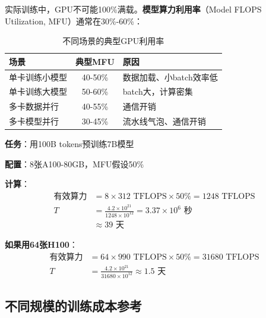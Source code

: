 实际训练中，GPU不可能100\%满载。\textbf{模型算力利用率}（Model FLOPS Utilization, MFU）通常在30\%-60\%：

\begin{table}[htbp]
\centering
\renewcommand{\arraystretch}{1.3}
\begin{tabular}{l|c|l}
\toprule
\textbf{场景} & \textbf{典型MFU} & \textbf{原因} \\
\midrule
单卡训练小模型 & 40-50\% & 数据加载、小batch效率低 \\
单卡训练大模型 & 50-60\% & batch大，计算密集 \\
多卡数据并行 & 40-55\% & 通信开销 \\
多卡模型并行 & 30-45\% & 流水线气泡、通信开销 \\
\bottomrule
\end{tabular}
\caption{不同场景的典型GPU利用率}
\end{table}

\begin{example}[预训练时间估算]
\textbf{任务}：用100B tokens预训练7B模型

\textbf{配置}：8张A100-80GB，MFU假设50\%

\textbf{计算}：
\begin{align}
    \text{有效算力} &= 8 \times 312 \text{ TFLOPS} \times 50\% = 1248 \text{ TFLOPS} \\
    T &= \frac{4.2 \times 10^{21}}{1248 \times 10^{12}} = 3.37 \times 10^{6} \text{ 秒} \\
    &\approx 39 \text{ 天}
\end{align}

\textbf{如果用64张H100}：
\begin{align}
    \text{有效算力} &= 64 \times 990 \text{ TFLOPS} \times 50\% = 31680 \text{ TFLOPS} \\
    T &= \frac{4.2 \times 10^{21}}{31680 \times 10^{12}} \approx 1.5 \text{ 天}
\end{align}
\end{example}

\subsection*{不同规模的训练成本参考}

